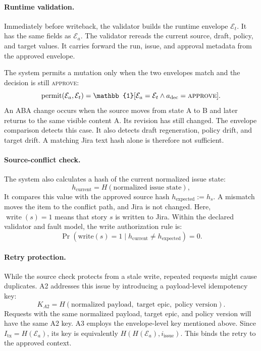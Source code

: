 \documentclass[pdflatex,sn-basic]{sn-jnl}
\begin{document}
\paragraph{Runtime validation.}
Immediately before writeback, the validator builds the runtime envelope $\mathcal{E}_t$. It has the same fields as $\mathcal{E}_a$. The validator rereads the current source, draft, policy, and target values. It carries forward the run, issue, and approval metadata from the approved envelope.

The system permits a mutation only when the two envelopes match and the decision is still \textsc{approve}:
\begin{equation}
\operatorname{permit}(\mathcal{E}_a,\mathcal{E}_t)
=\mathbb{1}[\mathcal{E}_a=\mathcal{E}_t \land a_{\mathrm{dec}}=\textsc{approve}].
\end{equation}
An ABA change occurs when the source moves from state A to B and later returns to the same visible content A. Its revision has still changed. The envelope comparison detects this case. It also detects draft regeneration, policy drift, and target drift. A matching Jira text hash alone is therefore not sufficient.

\paragraph{Source-conflict check.}
The system also calculates a hash of the current normalized issue state:
\begin{equation}
h_{\text{current}} = H(\text{normalized issue state}),
\end{equation}
It compares this value with the approved source hash $h_{\mathrm{expected}}:=h_s$. A mismatch moves the item to the conflict path, and Jira is not changed. Here, $\operatorname{write}(s)=1$ means that story $s$ is written to Jira. Within the declared validator and fault model, the write authorization rule is:
\begin{equation}
\Pr(\text{write}(s)=1 \mid h_{\text{current}}\ne h_{\text{expected}})=0.
\end{equation}

\paragraph{Retry protection.}
While the source check protects from a stale write, repeated requests might cause duplicates. A2 addresses this issue by introducing a payload-level idempotency key:
\begin{equation}
K_{A2} = H(\text{normalized payload},\;\text{target epic},\;\text{policy version}).
\end{equation}
Requests with the same normalized payload, target epic, and policy version will have the same A2 key. A3 employs the envelope-level key mentioned above. Since $I_{\mathrm{tx}}=H(\mathcal{E}_a)$, its key is equivalently $H(H(\mathcal{E}_a),i_{\mathrm{issue}})$. This binds the retry to the approved context.
\end{document}
